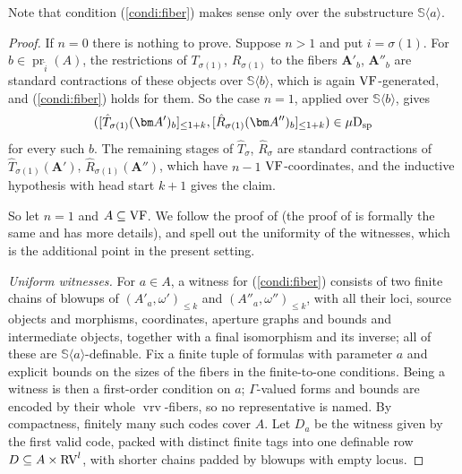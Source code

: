 \documentclass[12pt]{amsart}
\theoremstyle{plain}
\theoremstyle{definition}
\theoremstyle{remark}
\numberwithin{equation}{section}
\theoremstyle{plain}
\newcommand{\VF}{\textup{VF}}
\newcommand{\RV}{\textup{RV}}
\DeclareMathOperator{\pr}{pr}
\newcommand{\0}{\emptyset}
\newcommand{\sub}{\subseteq}
\newcommand{\la}{\langle}
\newcommand{\ra}{\rangle}
\newcommand{\dsp}{\textup{D}_{\textup{sp}}}
\newcommand{\mispdb}{\mu \dsp}
\DeclareMathOperator{\vrv}{vrv}
\begin{document}
Note that condition (\ref{condi:fiber}) makes sense only  over the substructure $\mathbb{S} \la a \ra$.

\begin{proof}
If $n = 0$ there is nothing to prove. Suppose $n > 1$ and put $i = \sigma(1)$. For $b \in \pr_{\tilde i}(A)$, the restrictions of $T_{\sigma(1)}$, $R_{\sigma(1)}$ to the fibers $\bm A'_b$, $\bm A''_b$ are standard contractions of these objects over $\mathbb S \la b \ra$, which is again $\VF$-generated, and (\ref{condi:fiber}) holds for them. So the case $n = 1$, applied over $\mathbb S \la b \ra$, gives
\[
([\hat T_{\sigma(1)}(\bm A')_b]_{\leq 1+k}, [\hat R_{\sigma(1)}(\bm A'')_b]_{\leq 1+k}) \in \mispdb
\]
for every such $b$. The remaining stages of $\hat T_\sigma$, $\hat R_\sigma$ are standard contractions of $\hat T_{\sigma(1)}(\bm A')$, $\hat R_{\sigma(1)}(\bm A'')$, which have $n-1$ $\VF$-coordinates, and the inductive hypothesis with head start $k+1$ gives the claim.

So let $n = 1$ and $A \sub \VF$. We follow the proof of \cite[Lemma~6.14]{Yin:int:acvf} (the proof of \cite[Lemma~5.36]{Yin:tcon:I} is formally the same and has more details), and spell out the uniformity of the witnesses, which is the additional point in the present setting.

\emph{Uniform witnesses.} For $a \in A$, a witness for (\ref{condi:fiber}) consists of two finite chains of blowups of $(A'_a, \omega')_{\leq k}$ and $(A''_a, \omega'')_{\leq k}$, with all their loci, source objects and morphisms, coordinates, aperture graphs and bounds and intermediate objects, together with a final isomorphism and its inverse; all of these are $\mathbb S \la a \ra$-definable. Fix a finite tuple of formulas with parameter $a$ and explicit bounds on the sizes of the fibers in the finite-to-one conditions. Being a witness is then a first-order condition on $a$; $\Gamma$-valued forms and bounds are encoded by their whole $\vrv$-fibers, so no representative is named. By compactness, finitely many such codes cover $A$. Let $D_a$ be the witness given by the first valid code, packed with distinct finite tags into one definable row $D \sub A \times \RV^l$, with shorter chains padded by blowups with empty locus.


\end{proof}
\end{document}
